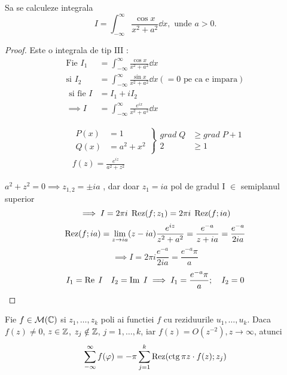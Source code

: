 \begin{aplicatie}
    Sa se calculeze integrala
    \[
        I = \int_{-\infty}^{\infty} \frac{\cos x}{x^2+a^2} \dd x, \text{ unde } a>0 .
    \]
    \begin{proof}
        Este o integrala de tip $\mathrm{III}$ :
        \begin{align*}
            \text{Fie } I_1 &= \int_{-\infty}^{\infty} \frac{\cos x}{x^2+a^2} \dd x \\
            \text{si }  I_2 &= \int_{-\infty}^{\infty} \frac{\sin x}{x^2+a^2} \dd x (= 0 \text{ pe ca e impara}) \\
            \text{ si fie } I &= I_1 + i I_2 \\
            \implies I &= \int_{-\infty}^{\infty} \frac{e^{ix}}{x^2+a^2} \dd x
        \end{align*}

        \begin{align*}
            &\left .
                \begin{aligned}
                    P(x) &= 1 \\
                    Q(x) &= a^2 +x^2
                \end{aligned}
            \right \}
            \begin{aligned}
                grad\; Q &\geq grad\; P+1 \\
                2 &\geq 1
            \end{aligned}
            \\
            &f(z) = \frac{e^{iz}}{a^2 +z^2}
        \end{align*}

        $a^2 +z^2 = 0 \implies z_{1,2} = \pm i a$ , dar doar $z_1 = i a$
        pol de gradul I $\in$ semiplanul superior
        \[
            \implies I = 2 \pi i\; \operatorname{Rez}(f;z_1) = 2 \pi i\; \operatorname{Rez}(f;i a)
        \]
        \[
            \operatorname{Rez}(f;i a) = \lim_{z \to ia} (z - i a) \frac{e^{iz}}{z^2+a^2}
                = \frac{e^{-a}}{z + i a} = \frac{e^{-a}}{2ia}
        \]
        \[
            \implies I = 2 \pi i \frac{e^{-a}}{2ia} = \frac{e^{-a}\pi}{a}
        \]
        \[
            I_1 = \operatorname{Re} \; I \quad I_2=\operatorname{Im} \; I
                \implies I_1 = \frac{e^{-a}\pi}{a}; \quad I_2 = 0
        \]
    \end{proof}
\end{aplicatie}

\begin{theorem}
    Fie $f \in \mathcal{M}(\mathbb{C})$ si $z_1 , \dotsc , z_k$ poli ai functiei $f$ cu
    reziduurile $u_1, \dotsc , u_k$.
    Daca $f(z) \neq 0$, $z \in \mathbb{Z}$, $z_j \notin \mathbb{Z}$, $j=1, \dotsc, k$,
    iar $f(z) = O(z^{-2}), z\to \infty$, atunci
    \[
        \sum_{-\infty}^{\infty} f(\varphi) = -\pi \sum_{j=1}^{k} \operatorname{Rez} ( \operatorname{ctg} \pi z \cdot f(z);z_j )
    \]
\end{theorem}

